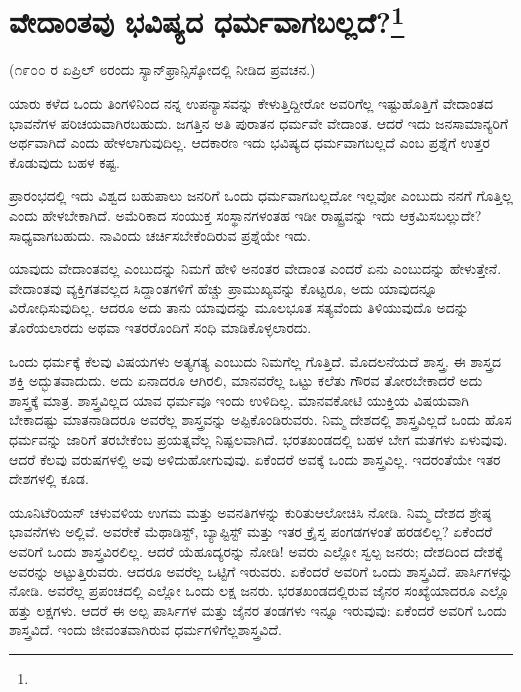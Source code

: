 
\chapter[ವೇದಾಂತವು ಭವಿಷ್ಯದ ಧರ್ಮವಾಗಬಲ್ಲದೆ?]{ವೇದಾಂತವು ಭವಿಷ್ಯದ ಧರ್ಮವಾಗಬಲ್ಲದೆ?\protect\footnote{}}

\begin{center}
(೧೯೦೦ ರ ಏಪ್ರಿಲ್ ೮ರಂದು ಸ್ಯಾನ್‌ಫ್ರಾನ್ಸಿಸ್ಕೋದಲ್ಲಿ ನೀಡಿದ ಪ್ರವಚನ.)
\end{center}

ಯಾರು ಕಳೆದ ಒಂದು ತಿಂಗಳಿನಿಂದ ನನ್ನ ಉಪನ್ಯಾಸವನ್ನು ಕೇಳುತ್ತಿದ್ದೀರೋ ಅವರಿಗೆಲ್ಲ ಇಷ್ಟುಹೊತ್ತಿಗೆ ವೇದಾಂತದ ಭಾವನೆಗಳ ಪರಿಚಯವಾಗಿರಬಹುದು. ಜಗತ್ತಿನ ಅತಿ ಪುರಾತನ ಧರ್ಮವೇ ವೇದಾಂತ. ಆದರೆ ಇದು ಜನಸಾಮಾನ್ಯರಿಗೆ ಅರ್ಥವಾಗಿದೆ ಎಂದು ಹೇಳಲಾಗುವುದಿಲ್ಲ. ಆದಕಾರಣ ಇದು ಭವಿಷ್ಯದ ಧರ್ಮವಾಗಬಲ್ಲದೆ ಎಂಬ ಪ್ರಶ್ನೆಗೆ ಉತ್ತರ ಕೊಡುವುದು ಬಹಳ ಕಷ್ಟ.

ಪ್ರಾರಂಭದಲ್ಲಿ ಇದು ವಿಶ್ವದ ಬಹುಪಾಲು ಜನರಿಗೆ ಒಂದು ಧರ್ಮವಾಗಬಲ್ಲದೋ ಇಲ್ಲವೋ ಎಂಬುದು ನನಗೆ ಗೊತ್ತಿಲ್ಲ ಎಂದು ಹೇಳಬೇಕಾಗಿದೆ. ಅಮೆರಿಕಾದ ಸಂಯುಕ್ತ ಸಂಸ್ಥಾನಗಳಂತಹ ಇಡೀ ರಾಷ್ಟ್ರವನ್ನು ಇದು ಆಕ್ರಮಿಸಬಲ್ಲುದೇ? ಸಾಧ್ಯವಾಗಬಹುದು. ನಾವಿಂದು ಚರ್ಚಿಸಬೇಕೆಂದಿರುವ ಪ್ರಶ್ನೆಯೇ ಇದು.

ಯಾವುದು ವೇದಾಂತವಲ್ಲ ಎಂಬುದನ್ನು ನಿಮಗೆ ಹೇಳಿ ಅನಂತರ ವೇದಾಂತ ಎಂದರೆ ಏನು ಎಂಬುದನ್ನು ಹೇಳುತ್ತೇನೆ. ವೇದಾಂತವು ವ್ಯಕ್ತಿಗತವಲ್ಲದ ಸಿದ್ದಾಂತಗಳಿಗೆ ಹೆಚ್ಚು ಪ್ರಾಮುಖ್ಯವನ್ನು ಕೊಟ್ಟರೂ, ಅದು ಯಾವುದನ್ನೂ ವಿರೋಧಿಸುವುದಿಲ್ಲ. ಆದರೂ ಅದು ತಾನು ಯಾವುದನ್ನು ಮೂಲಭೂತ ಸತ್ಯವೆಂದು ತಿಳಿಯುವುದೊ ಅದನ್ನು ತೊರೆಯಲಾರದು ಅಥವಾ ಇತರರೊಂದಿಗೆ ಸಂಧಿ ಮಾಡಿಕೊಳ್ಳಲಾರದು.

ಒಂದು ಧರ್ಮಕ್ಕೆ ಕೆಲವು ವಿಷಯಗಳು ಅತ್ಯಗತ್ಯ ಎಂಬುದು ನಿಮಗೆಲ್ಲ ಗೊತ್ತಿದೆ. ಮೊದಲನೆಯದೆ ಶಾಸ್ತ್ರ. ಈ ಶಾಸ್ತ್ರದ ಶಕ್ತಿ ಅದ್ಭುತವಾದುದು. ಅದು ಏನಾದರೂ ಆಗಿರಲಿ, ಮಾನವರೆಲ್ಲ ಒಟ್ಟು ಕಲೆತು ಗೌರವ ತೋರಬೇಕಾದರೆ ಅದು ಶಾಸ್ತ್ರಕ್ಕೆ ಮಾತ್ರ. ಶಾಸ್ತ್ರವಿಲ್ಲದ ಯಾವ ಧರ್ಮವೂ ಇಂದು ಉಳಿದಿಲ್ಲ. ಮಾನವಕೋಟಿ ಯುಕ್ತಿಯ ವಿಷಯವಾಗಿ ಬೇಕಾದಷ್ಟು ಮಾತನಾಡಿದರೂ ಅವರೆಲ್ಲ ಶಾಸ್ತ್ರವನ್ನು ಅಪ್ಪಿಕೊಂಡಿರುವರು. ನಿಮ್ಮ ದೇಶದಲ್ಲಿ ಶಾಸ್ತ್ರವಿಲ್ಲದೆ ಒಂದು ಹೊಸ ಧರ್ಮವನ್ನು ಜಾರಿಗೆ ತರಬೇಕೆಂಬ ಪ್ರಯತ್ನವೆಲ್ಲ ನಿಷ್ಪಲವಾಗಿದೆ. ಭರತಖಂಡದಲ್ಲಿ ಬಹಳ ಬೇಗ ಮತಗಳು ಏಳುವುವು. ಆದರೆ ಕೆಲವು ವರುಷಗಳಲ್ಲಿ ಅವು ಅಳಿದುಹೋಗುವುವು. ಏಕೆಂದರೆ ಅವಕ್ಕೆ ಒಂದು ಶಾಸ್ತ್ರವಿಲ್ಲ. ಇದರಂತೆಯೇ ಇತರ ದೇಶಗಳಲ್ಲಿ ಕೂಡ.

ಯೂನಿಟೆರಿಯನ್ ಚಳುವಳಿಯ ಉಗಮ ಮತ್ತು ಅವನತಿಗಳನ್ನು ಕುರಿತು\break ಆಲೋಚಿಸಿ ನೋಡಿ. ನಿಮ್ಮ ದೇಶದ ಶ್ರೇಷ್ಠ ಭಾವನೆಗಳು ಅಲ್ಲಿವೆ. ಅವರೇಕೆ ಮೆಥಾಡಿಸ್ಟ್, ಬ್ಯಾಪ್ಟಿಸ್ಟ್ ಮತ್ತು ಇತರ ಕ್ರೈಸ್ತ ಪಂಗಡಗಳಂತೆ ಹರಡಲಿಲ್ಲ? ಏಕೆಂದರೆ ಅವರಿಗೆ ಒಂದು ಶಾಸ್ತ್ರವಿರಲಿಲ್ಲ. ಆದರೆ ಯೆಹೂದ್ಯರನ್ನು ನೋಡಿ! ಅವರು ಎಲ್ಲೋ ಸ್ವಲ್ಪ ಜನರು; ದೇಶದಿಂದ ದೇಶಕ್ಕೆ ಅವರನ್ನು ಅಟ್ಟುತ್ತಿರುವರು. ಆದರೂ ಅವರೆಲ್ಲ ಒಟ್ಟಿಗೆ ಇರುವರು. ಏಕೆಂದರೆ ಅವರಿಗೆ ಒಂದು ಶಾಸ್ತ್ರವಿದೆ. ಪಾರ್ಸಿಗಳನ್ನು ನೋಡಿ. ಅವರೆಲ್ಲ ಪ್ರಪಂಚದಲ್ಲಿ ಎಲ್ಲೋ ಒಂದು ಲಕ್ಷ ಜನರು. ಭರತಖಂಡದಲ್ಲಿರುವ ಜೈನರ ಸಂಖ್ಯೆಯಾದರೂ ಎಲ್ಲೊ ಹತ್ತು ಲಕ್ಷಗಳು. ಆದರೆ ಈ ಅಲ್ಪ ಪಾರ್ಸಿಗಳ ಮತ್ತು ಜೈನರ ತಂಡಗಳು ಇನ್ನೂ ಇರುವುವು: ಏಕೆಂದರೆ ಅವರಿಗೆ ಒಂದು ಶಾಸ್ತ್ರವಿದೆ. ಇಂದು ಜೀವಂತವಾಗಿರುವ ಧರ್ಮಗಳಿಗೆಲ್ಲ\break ಶಾಸ್ತ್ರವಿದೆ.

